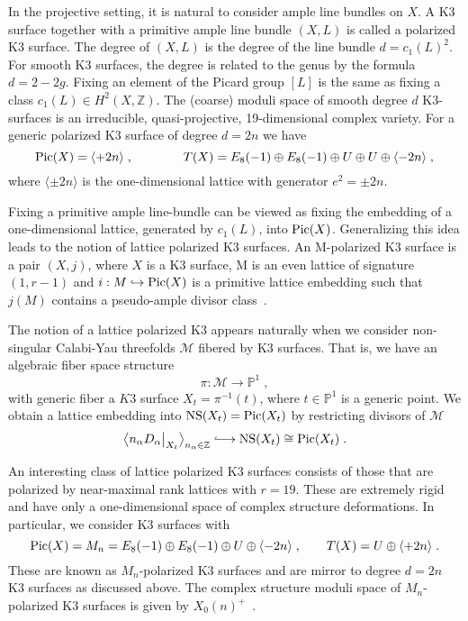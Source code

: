 \documentclass[11pt,a4paper]{article}
\numberwithin{equation}{section}
\numberwithin{table}{section}\setlength{\multlinegap}{25pt}
\begin{document}
In the projective setting, it is natural to consider ample line bundles on $X$. A K3 surface together with a primitive ample line bundle $(X,L)$ is called a polarized K3 surface. The degree of $(X,L)$ is the degree of the line bundle $d=c_1(L)^2$. For smooth K3 surfaces, the degree is related to the genus by the formula $d=2-2g$. Fixing an element of the Picard group $[L]$ is the same as fixing a class $c_1(L)\in H^2(X,\mathbb{Z})$. The (coarse) moduli space of smooth degree $d$ K3-surfaces is an irreducible, quasi-projective, 19-dimensional complex variety. For a generic polarized K3 surface of degree $d=2n$ we have
\begin{equation}
	\textup{Pic}(X)=\langle +2n\rangle\;,\qquad\qquad T(X)=E_8(-1)\oplus E_8(-1)\oplus U \oplus U \oplus \langle -2n\rangle \;,
\end{equation}
where $\langle\pm 2n\rangle$ is the one-dimensional lattice with generator $e^2=\pm 2n$.

Fixing a primitive ample line-bundle can be viewed as fixing the embedding of a one-dimensional lattice, generated by $c_1(L)$, into $\textup{Pic}(X)$. Generalizing this idea leads to the notion of lattice polarized K3 surfaces. An M-polarized K3 surface is a pair $(X,j)$, where $X$ is a K3 surface, M is an even lattice of signature $(1,r-1)$ and $i:M\hookrightarrow \textup{Pic}(X)$ is a primitive lattice embedding such that $j(M)$ contains a pseudo-ample divisor class~\cite{Dolgachev:1996xw,Dolgachev:2005abc}.

The notion of a lattice polarized K3 appears naturally when we consider non-singular Calabi-Yau threefolds $\mathcal{M}$ fibered by K3 surfaces. That is, we have an algebraic fiber space structure
\begin{equation}
	\pi:\mathcal{M}\to \mathbb{P}^1\;,
\end{equation}
with generic fiber a $K3$ surface $X_t=\pi^{-1}(t)$, where $t\in \mathbb{P}^1$ is a generic point. We obtain a lattice embedding into $\textup{NS}(X_t)=\textup{Pic}(X_t)$ by restricting divisors of $\mathcal{M}$
\begin{equation}
	\big\langle n_\alpha D_\alpha\big|_{X_t}\big\rangle_{n_\alpha\in\mathbb{Z}} \lhook\joinrel\longrightarrow \textup{NS}(X_t)\cong\textup{Pic}(X_t)\;.
\end{equation}

An interesting class of lattice polarized K3 surfaces consists of those that are polarized by near-maximal rank lattices with $r=19$. These are extremely rigid and have only a one-dimensional space of complex structure deformations. In particular, we consider K3 surfaces with
\begin{equation}
	\textup{Pic}(X)=M_n=E_8(-1)\oplus E_8(-1)\oplus U \oplus \langle -2n \rangle\;,\qquad T(X)=U\oplus \langle +2n\rangle\;.
\end{equation}
These are known as $M_n$-polarized K3 surfaces and are mirror to degree $d=2n$ K3 surfaces as discussed above. The complex structure moduli space of $M_n$-polarized K3 surfaces is given by $X_0(n)^+$~\cite{Dolgachev:1996xw,Doran_2019}.
\end{document}
